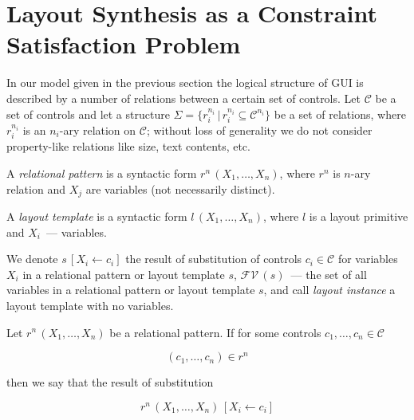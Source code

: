 \section{Layout Synthesis as a Constraint Satisfaction Problem}
\label{sec:guidelines}


In our model given in the previous section the logical structure of GUI is described by
a number of relations between a certain set of controls. Let $\mathcal{C}$ be a set of
controls and let a structure $\Sigma=\{r^{n_i}_i\, |\, r^{n_i}_i\subseteq\mathcal{C}^{n_i}\}$ be a set of
relations, where $r^{n_i}_i$ is an \mbox{$n_i$-ary} relation on $\mathcal{C}$; without loss
of generality we do not consider property-like relations like size, text contents, etc.

A \emph{relational pattern} is a syntactic form $r^n\,(X_1,\dots,X_n)$, where $r^n$ is $n$-ary
relation and $X_j$ are variables (not necessarily distinct).

A \emph{layout template} is a syntactic form $l\,(X_1,\dots,X_n)$, where $l$ is a layout primitive and
$X_i$~--- variables.


We denote $s\,[X_i\gets c_i]$ the result of substitution of controls $c_i\in\mathcal{C}$
for variables $X_i$ in a relational pattern or layout template $s$, $\mathcal{FV}\,(s)$~--- the set of all
variables in a relational pattern or layout template $s$, and call \emph{layout instance} a layout
template with no variables.

Let $r^n\,(X_1,\dots,X_n)$ be a relational pattern. If for some controls $c_1,\dots,c_n\in\mathcal{C}$

\[
(c_1,\dots,c_n)\in r^n
\]

\noindent  then we say that the result of substitution

\[
r^n\,(X_1,\dots,X_n)\,[X_i\gets c_i]
\]

